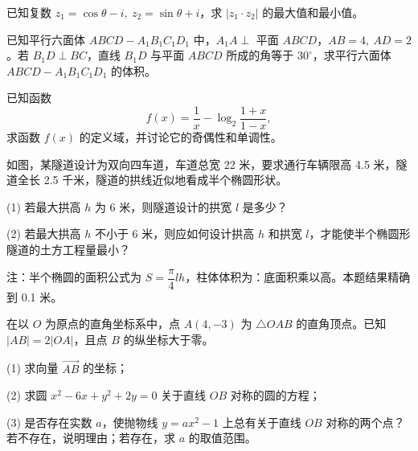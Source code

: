 \begin{question}
已知复数 \(z_1=\cos\theta-i,\ z_2=\sin\theta+i\)，求 \(|z_1\cdot z_2|\) 的最大值和最小值。

\Needspace{0.4\textheight}
\end{question}
\begin{question}
已知平行六面体 \(ABCD-A_1B_1C_1D_1\) 中，\(A_1A\perp\) 平面 \(ABCD\)，\(AB=4,\ AD=2\)。若 \(B_1D\perp BC\)，直线 \(B_1D\) 与平面 \(ABCD\) 所成的角等于 \(30^\circ\)，求平行六面体 \(ABCD-A_1B_1C_1D_1\) 的体积。
\nopagebreak[4]
\begin{center}\end{center}
\nopagebreak[4]
\end{question}
\begin{question}
已知函数
\nopagebreak[4]
\[
    f(x)=\frac1x-\log_2\frac{1+x}{1-x},
\]
    求函数 \(f(x)\) 的定义域，并讨论它的奇偶性和单调性。

\Needspace{0.4\textheight}
\end{question}
\begin{question}
如图，某隧道设计为双向四车道，车道总宽 22 米，要求通行车辆限高 4.5 米，隧道全长 2.5 千米，隧道的拱线近似地看成半个椭圆形状。

    (1) 若最大拱高 \(h\) 为 6 米，则隧道设计的拱宽 \(l\) 是多少？

    (2) 若最大拱高 \(h\) 不小于 6 米，则应如何设计拱高 \(h\) 和拱宽 \(l\)，才能使半个椭圆形隧道的土方工程量最小？

    注：半个椭圆的面积公式为 \(S=\dfrac{\pi}{4}lh\)，柱体体积为：底面积乘以高。本题结果精确到 0.1 米。
\nopagebreak[4]
\begin{center}\end{center}
\nopagebreak[4]
\end{question}
\begin{question}
在以 \(O\) 为原点的直角坐标系中，点 \(A(4,-3)\) 为 \(\triangle OAB\) 的直角顶点。已知 \(|AB|=2|OA|\)，且点 \(B\) 的纵坐标大于零。

    (1) 求向量 \(\overrightarrow{AB}\) 的坐标；

    (2) 求圆 \(x^2-6x+y^2+2y=0\) 关于直线 \(OB\) 对称的圆的方程；

    (3) 是否存在实数 \(a\)，使抛物线 \(y=ax^2-1\) 上总有关于直线 \(OB\) 对称的两个点？若不存在，说明理由；若存在，求 \(a\) 的取值范围。

\end{question}
